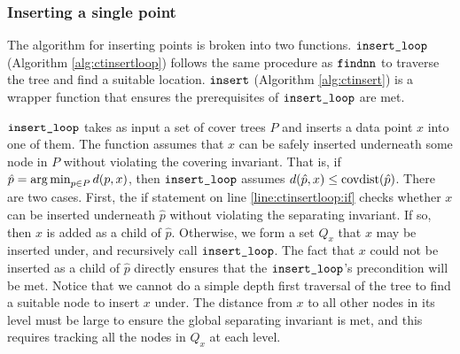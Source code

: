 \documentclass[../main.tex]{subfiles}
\newcommand{\dist}[2]{\distf({#1},{#2})}
\newcommand{\distf}{d}
\newcommand{\mkfunction}[1]{\ifmmode{\text{{#1}}}}
\newcommand{\children}[1]   {\mkfunction{children}({#1})}
\newcommand{\covdist}[1]    {\mkfunction{covdist}({#1})}
\newcommand{\maxdist}[1]    {\mkfunction{maxdist}({#1})}
\newcommand{\mkprocedure}[1]{\textnormal{\ttfamily {#1}}}
\newcommand{\findnn}{\mkprocedure{findnn}}
\newcommand{\ctinsert}{\ensuremath{\textnormal{\ttfamily insert}}}
\newcommand{\ctinsertloop}{\ensuremath{\textnormal{\ttfamily insert\_loop}}}
\begin{document}


\subsubsection{Inserting a single point}

The algorithm for inserting points is broken into two functions.
$\ctinsertloop$ (Algorithm \ref{alg:ctinsertloop}) follows the same procedure as $\findnn$ to traverse the tree and find a suitable location.
$\ctinsert$ (Algorithm \ref{alg:ctinsert}) is a wrapper function that ensures the prerequisites of $\ctinsertloop$ are met.

$\ctinsertloop$ takes as input a set of cover trees $P$ and inserts a data point $x$ into one of them.
The function assumes that $x$ can be safely inserted underneath some node in $P$ without violating the covering invariant. 
That is, if $\hat p=\argmin_{p\in P}\dist{p}{x}$, 
then $\ctinsertloop$ assumes $\dist{\hat p}{x} \le \covdist{\hat p}$.
There are two cases.
First, the if statement on line \ref{line:ctinsertloop:if} checks whether $x$ can be inserted underneath $\hat p$ without violating the separating invariant.
If so, then $x$ is added as a child of $\hat p$.
Otherwise, we form a set $Q_x$ that $x$ may be inserted under,
and recursively call $\ctinsertloop$.
The fact that $x$ could not be inserted as a child of $\hat p$ directly ensures that the $\ctinsertloop$'s precondition will be met.
Notice that we cannot do a simple depth first traversal of the tree to find a suitable node to insert $x$ under.
The distance from $x$ to all other nodes in its level must be large to ensure the global separating invariant is met,
and this requires tracking all the nodes in $Q_x$ at each level.
\end{document}
